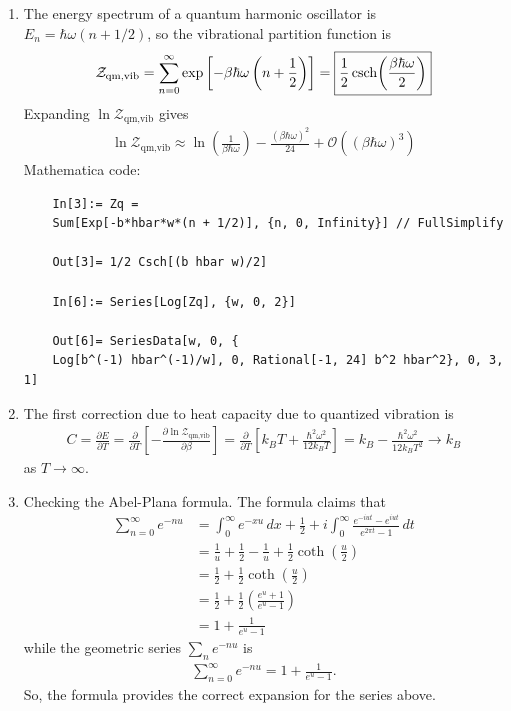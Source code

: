 \documentclass{article}
\theoremstyle{definition}
\newcommand{\p}{\partial}
\newcommand{\be}{\beta}
\newcommand{\f}[2]{\frac{#1}{#2}}
\newcommand{\lp}{\left(}
\newcommand{\rp}{\right)}
\newcommand{\lb}{\left[}
\newcommand{\rb}{\right]}
\begin{document}
\begin{enumerate}[label=(\alph*)]
	\item The energy spectrum of a quantum harmonic oscillator is $E_n = \hbar \omega (n + 1/2)$, so the vibrational partition function is 
	\begin{align*}
	\mathcal{Z}_\text{qm,vib} = \sum^\infty_{n=0} \exp\lb -\be \hbar \omega\lp n + \f{1}{2} \rp \rb = \boxed{\f{1}{2}\csch(\f{\be \hbar \omega}{2})}
	\end{align*}
	Expanding $\ln \mathcal{Z}_\text{qm,vib}$ gives
	\begin{align*}
	\boxed{\ln \mathcal{Z}_\text{qm,vib} \approx \ln \lp \f{1}{\be \hbar \omega}\rp - \f{(\be \hbar \omega)^2}{24} + \mathcal{O}((\be \hbar \omega)^3)}
	\end{align*}
	Mathematica code:
	\begin{lstlisting}
	In[3]:= Zq = 
	Sum[Exp[-b*hbar*w*(n + 1/2)], {n, 0, Infinity}] // FullSimplify
	
	Out[3]= 1/2 Csch[(b hbar w)/2]
	
	In[6]:= Series[Log[Zq], {w, 0, 2}]
	
	Out[6]= SeriesData[w, 0, {
	Log[b^(-1) hbar^(-1)/w], 0, Rational[-1, 24] b^2 hbar^2}, 0, 3, 1]
	\end{lstlisting}
	
	
	\item The first correction due to heat capacity due to quantized vibration is
	\begin{align*}
	C = \f{\p E}{\p T} = \f{\p }{\p T}\lb - \f{\p \ln \mathcal{Z}_\text{qm,vib} }{\p \be} \rb = \f{\p }{\p T}\lb k_BT + \f{\hbar^2 \omega^2}{12 k_BT}\rb = k_B - \f{\hbar^2 \omega^2}{12 k_B T^2} \to \boxed{k_B}
	\end{align*}
	as $T\to \infty$. 
	
	\item Checking the Abel-Plana formula. The formula claims that
	\begin{align*}
	\sum^\infty_{n=0} e^{-nu} 
	&= \int^\infty_0 e^{-xu}\,dx + \f{1}{2} + i\int^\infty_0 \f{e^{-iut} - e^{iut}}{e^{2\pi t} - 1}\,dt \\
	&= \f{1}{u} + \f{1}{2} - \f{1}{u} + \f{1}{2}\coth(\f{u}{2})\\
	&=  \f{1}{2} + \f{1}{2}\coth(\f{u}{2}) \\
	&= \f{1}{2} + \f{1}{2}\lp \f{e^u + 1}{ e^u - 1} \rp \\
	&= 1 + \f{1}{e^u - 1} 
	\end{align*}
	while the geometric series $\sum_n e^{-nu}$ is 
	\begin{align*}
	\sum^\infty_{n=0} e^{-nu} = 1 + \f{1}{e^u - 1}.
	\end{align*}
	So, the formula provides the correct expansion for the series above. 
	

\end{enumerate}
\end{document}
